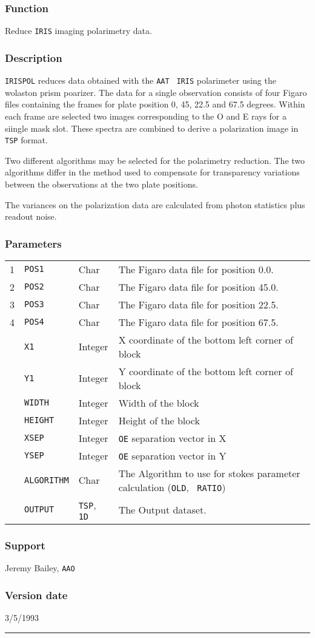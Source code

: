 \documentclass[11pt,twoside,nolof,noabs]{starlink}
\newenvironment{manroutinedescription}{}{\par{}\rule{\textwidth}{0.5mm}}
\newcommand{\manroutineitem}[2]{\subsubsection*{#1}#2\par{}}
\newenvironment{manparametertable}{\begin{tabular}{lllp{80mm}}}%
{\end{tabular}}
\newcommand{\manparameterentry}[3]{\\#1 & #2 & #3 & }
\providecommand{\mantt}[1]{\texttt{#1}}
\begin{document}
\begin{manroutinedescription}
\manroutineitem{Function}{}
        Reduce {\mantt{IRIS}} imaging polarimetry data.

\manroutineitem{Description}{}
        {\mantt{IRISPOL}} reduces data obtained with the {\mantt{AAT}} {\mantt{%
IRIS}} polarimeter
        using the wolaston  prism poarizer. The data for a
        single observation consists of four Figaro files containing the
        frames for plate position 0, 45, 22.5 and 67.5 degrees. Within each
        frame are selected two images corresponding to the O and E rays for
        a siingle mask slot. These spectra are combined
        to derive a polarization image in {\mantt{TSP}} format.

        Two different algorithms may be selected for the polarimetry
        reduction. The two algorithms differ in the method used to
        compensate for transparency variations between the observations
        at the two plate positions.

        The variances on the polarization data are calculated from photon
        statistics plus readout noise.

\manroutineitem{Parameters}{}
\begin{manparametertable}
\manparameterentry{1}{{\mantt{POS1}}}{Char}     The Figaro data file for %
position 0.0.
\manparameterentry{2}{{\mantt{POS2}}}{Char}     The Figaro data file for %
position 45.0.
\manparameterentry{3}{{\mantt{POS3}}}{Char}     The Figaro data file for %
position 22.5.
\manparameterentry{4}{{\mantt{POS4}}}{Char}     The Figaro data file for %
position 67.5.
\manparameterentry{}{{\mantt{X1}}}{Integer}  X coordinate of the bottom left %
corner of block
\manparameterentry{}{{\mantt{Y1}}}{Integer}  Y coordinate of the bottom left %
corner of block
\manparameterentry{}{{\mantt{WIDTH}}}{Integer}  Width of the block
\manparameterentry{}{{\mantt{HEIGHT}}}{Integer}  Height of the block
\manparameterentry{}{{\mantt{XSEP}}}{Integer}  {\mantt{OE}} separation vector %
in X
\manparameterentry{}{{\mantt{YSEP}}}{Integer}  {\mantt{OE}} separation vector %
in Y
\manparameterentry{}{{\mantt{ALGORITHM}}}{Char}     The Algorithm to use for %
stokes
                               parameter calculation ({\mantt{OLD}}, {\mantt{%
RATIO}})
\manparameterentry{}{{\mantt{OUTPUT}}}{{\mantt{TSP}}, {\mantt{1D}}}  The %
Output dataset.

\end{manparametertable}
\manroutineitem{Support}{Jeremy Bailey, {\mantt{AAO}}}
\manroutineitem{Version date}{3/5/1993}
\end{manroutinedescription}
\end{document}
